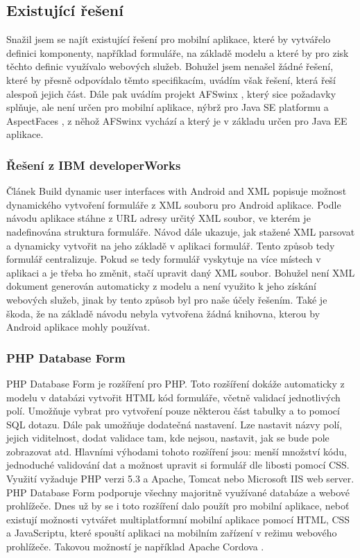 \subsection{Existující řešení}
Snažil jsem se najít existující řešení pro mobilní aplikace, které by vytvářelo definici komponenty, například formuláře, na základě modelu a které by pro zisk těchto definic využívalo webových služeb. Bohužel jsem nenašel žádné řešení, které by přesně odpovídalo těmto specifikacím, uvádím však řešení, která řeší alespoň jejich část. Dále pak uvádím projekt AFSwinx \cite{citation-needed}, který sice požadavky splňuje, ale není určen pro mobilní aplikace, nýbrž pro Java SE platformu a AspectFaces \cite{aspect-faces} , z něhož AFSwinx vychází a který je v základu určen pro Java EE aplikace.

\subsubsection{Řešení z IBM developerWorks}
Článek Build dynamic user interfaces with Android and XML \cite{dynamic-android-xml} popisuje možnost dynamického vytvoření formuláře z XML souboru pro Android aplikace. Podle návodu aplikace stáhne z URL adresy určitý XML soubor, ve kterém je nadefinována struktura formuláře. Návod dále ukazuje, jak stažené XML parsovat a dynamicky vytvořit na jeho základě v aplikaci formulář. Tento způsob tedy formulář centralizuje. Pokud se tedy formulář vyskytuje na více místech v aplikaci a je třeba ho změnit, stačí upravit daný XML soubor. Bohužel není XML dokument generován automaticky z modelu a není využito k jeho získání webových služeb, jinak by tento způsob byl pro naše účely řešením. Také je škoda, že na základě návodu nebyla vytvořena žádná knihovna, kterou by Android aplikace mohly používat.

\subsubsection{PHP Database Form}
PHP Database Form \cite{phpdbform} je rozšíření pro PHP. Toto rozšíření dokáže automaticky z modelu v databázi vytvořit HTML kód formuláře, včetně validací jednotlivých polí. Umožňuje vybrat pro vytvoření pouze některou část tabulky a to pomocí SQL dotazu. Dále pak umožňuje dodatečná nastavení. Lze nastavit názvy polí, jejich viditelnost, dodat validace tam, kde nejsou, nastavit, jak se bude pole zobrazovat atd. Hlavními výhodami tohoto rozšíření jsou: menší množství kódu, jednoduché validování dat a možnost upravit si formulář dle libosti pomocí CSS. Využití vyžaduje PHP verzi 5.3 a Apache, Tomcat nebo Microsoft IIS web server. PHP Database Form podporuje všechny majoritně využívané databáze a webové prohlížeče. Dnes už by se i toto rozšíření dalo použít pro mobilní aplikace, neboť existují možnosti vytvářet multiplatformní mobilní aplikace pomocí HTML, CSS a JavaScriptu, které spouští aplikaci na mobilním zařízení v režimu webového prohlížeče. Takovou možností je například Apache Cordova \cite{apache-cordova}.

